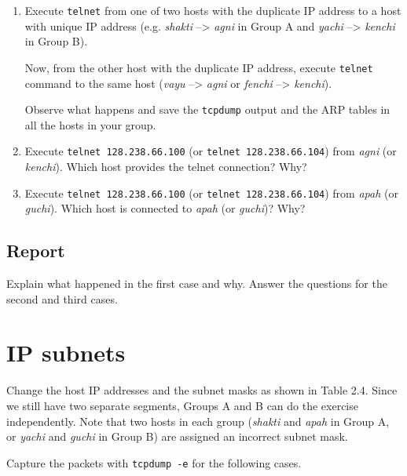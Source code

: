 \documentclass{../UTNetLab}
\begin{document}
    \begin{enumerate}
        \item Execute \lstinline{telnet} from one of two hosts with the duplicate IP address to a host with unique IP address (e.g. \textit{shakti} –> \textit{agni} in Group A and \textit{yachi} –> \textit{kenchi} in Group B).

        Now, from the other host with the duplicate IP address, execute \lstinline{telnet} command to the same host (\textit{vayu} –> \textit{agni} or \textit{fenchi} –> \textit{kenchi}).

        Observe what happens and save the \lstinline{tcpdump} output and the ARP tables in all the hosts in your group.
        
        \item Execute \lstinline{telnet 128.238.66.100} (or \lstinline{telnet 128.238.66.104}) from \textit{agni} (or \textit{kenchi}).
        Which host provides the telnet connection?
        Why?
        
        \item Execute \lstinline{telnet 128.238.66.100} (or \lstinline{telnet 128.238.66.104}) from \textit{apah} (or \textit{guchi}). Which host is connected to \textit{apah} (or \textit{guchi})? Why?
    \end{enumerate}
    
    \subsection*{Report}
    Explain what happened in the first case and why.
    Answer the questions for the second and third cases.

\section{IP subnets}
    Change the host IP addresses and the subnet masks as shown in Table 2.4. Since we still have two separate segments, Groups A and B can do the exercise independently.
    Note that two hosts in each group (\textit{shakti} and \textit{apah} in Group A, or \textit{yachi} and \textit{guchi} in Group B) are assigned an incorrect subnet mask.

    Capture the packets with \lstinline{tcpdump -e} for the following cases.
\end{document}
